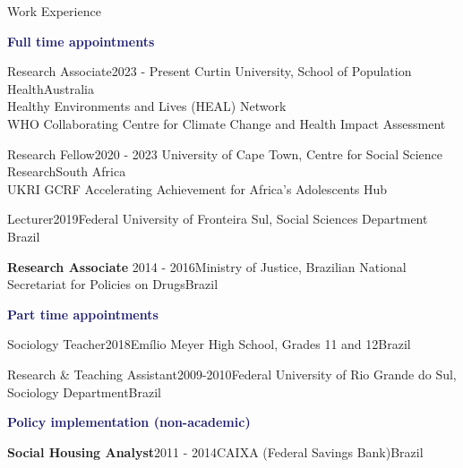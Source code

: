 \begin{rSection}{Work Experience}


\textcolor{MidnightBlue}{\textbf{Full time appointments}}

\begin{rSubsection}
{Research Associate}{2023 - Present}
{Curtin University, School of Population Health}{Australia}\\
Healthy Environments and Lives (HEAL) Network\\
WHO Collaborating Centre for Climate Change and Health Impact Assessment
\end{rSubsection}

\begin{rSubsection}
{Research Fellow}{2020 - 2023}
{University of Cape Town, Centre for Social Science Research}{South Africa}\\
UKRI GCRF Accelerating Achievement for Africa's Adolescents Hub
\end{rSubsection}

\begin{rSubsection}{Lecturer}{2019}{Federal University of Fronteira Sul, Social Sciences Department} {Brazil}\par
\end{rSubsection}

\begin{rSubsection}{\textbf{Research Associate}}{ 2014 - 2016}{Ministry of Justice, Brazilian National Secretariat for Policies on Drugs}{Brazil}\par
\end{rSubsection}

\vspace{1em}
\textcolor{MidnightBlue}{\textbf{Part time appointments}}

\begin{rSubsection}{Sociology Teacher}{2018}{Emílio Meyer High School, Grades 11 and 12}{Brazil}\par
\end{rSubsection}

\begin{rSubsection}{Research \& Teaching Assistant}{2009-2010}{Federal University of Rio Grande do Sul, Sociology Department}{Brazil}\par
\end{rSubsection}


\vspace{1em}
\textcolor{MidnightBlue}{\textbf{Policy implementation (non-academic)}}

\begin{rSubsection}{\textbf{Social Housing Analyst}}{2011 -  2014}{CAIXA (Federal Savings Bank)}{Brazil}\par
\end{rSubsection}

\end{rSection}